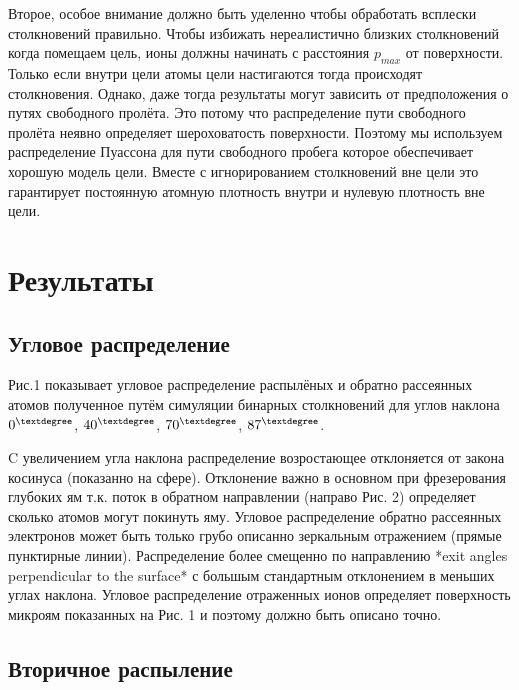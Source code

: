 \documentclass[a4paper,fontsize=12pt]{article}
\begin{document}
Второе, особое внимание должно быть уделенно чтобы обработать всплески столкновений правильно. Чтобы избижать нереалистично близких столкновений когда помещаем цель, ионы должны начинать с расстояния $p_{max}$ от поверхности. Только если внутри цели атомы цели настигаются тогда происходят столкновения. Однако, даже тогда результаты могут зависить от предположения о путях свободного пролёта. Это потому что распределение пути свободного пролёта неявно определяет шероховатость поверхности. Поэтому мы используем распределение Пуассона для пути свободного пробега которое обеспечивает хорошую модель цели. Вместе с игнорированием столкновений вне цели это гарантирует постоянную атомную плотность внутри и нулевую плотность вне цели.

\section{Результаты}
\subsection{Угловое распределение}

Рис.1 показывает угловое распределение распылёных и обратно рассеянных атомов полученное путём симуляции бинарных столкновений для углов наклона
  $0^{\textdegree}$,
  $40^{\textdegree}$,
  $70^{\textdegree}$,
  $87^{\textdegree}$.

C увеличением угла наклона распределение возростающее отклоняется от закона косинуса (показанно на сфере). Отклонение важно в основном при фрезерования глубоких ям т.к. поток в обратном направлении (направо Рис. 2) определяет сколько атомов могут покинуть яму.
Угловое распределение обратно рассеянных электронов может быть только грубо описанно зеркальным отражением (прямые пунктирные линии). Распределение более смещенно по направлению *exit angles perpendicular to the surface* с большым стандартным отклонением в меньших углах наклона. Угловое распределение отраженных ионов определяет поверхность микроям показанных на Рис. 1 и поэтому должно быть описано точно.

\subsection{Вторичное распыление}
\end{document}
